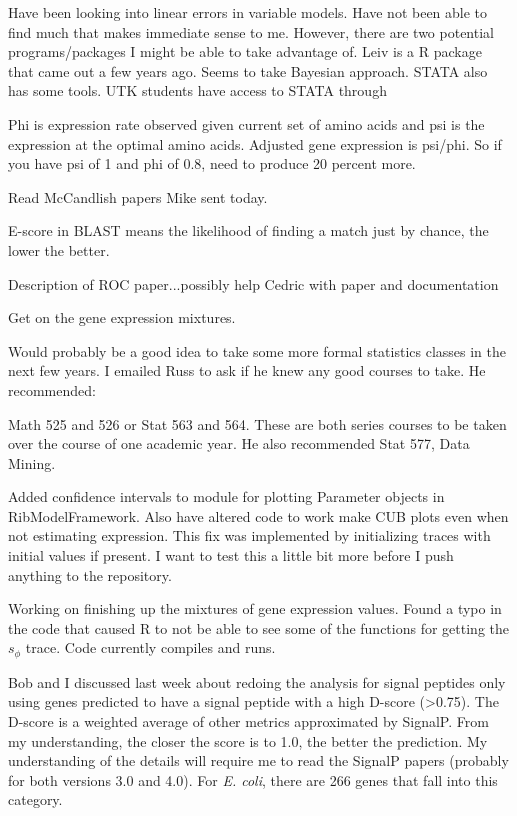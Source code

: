 \documentclass[11pt]{labbook}
\begin{document}
Have been looking into linear errors in variable models. Have not been able to find much that makes immediate sense to me. However, there are two potential programs/packages I might be able to take advantage of. Leiv is a R package that came out a few years ago. Seems to take Bayesian approach. STATA also has some tools. UTK students have access to STATA through 


Phi is expression rate observed given current set of amino acids and psi is the expression at the optimal amino acids. Adjusted gene expression is psi/phi. So if you have psi of 1 and phi of 0.8, need to produce 20 percent more.

Read McCandlish papers Mike sent today.

E-score in BLAST means the likelihood of finding a match just by chance, the lower the better. 

Description of ROC paper...possibly help Cedric with paper and documentation

Get on the gene expression mixtures.  

Would probably be a good idea to take some more formal statistics classes in the next few years. I emailed Russ to ask if he knew any good courses to take. He recommended:

Math 525 and 526 or Stat 563 and 564. These are both series courses to be taken over the course of one academic year. He also recommended Stat 577, Data Mining. 

Added confidence intervals to module for plotting Parameter objects in RibModelFramework. Also have altered code to work make CUB plots even when not estimating expression. This fix was implemented by initializing traces with initial values if present. I want to test this a little bit more before I push anything to the repository. 

Working on finishing up the mixtures of gene expression values. Found a typo in the code that caused R to not be able to see some of the functions for getting the $s_\phi$ trace. Code currently compiles and runs. 

Bob and I discussed last week about redoing the analysis for signal peptides only using genes predicted to have a signal peptide with a high D-score (>0.75). The D-score is a weighted average of other metrics approximated by SignalP. From my understanding, the closer the score is to 1.0, the better the prediction. My understanding of the details will require me to read the SignalP papers (probably for both versions 3.0 and 4.0). For \textit{E. coli}, there are 266 genes that fall into this category. 
\end{document}
